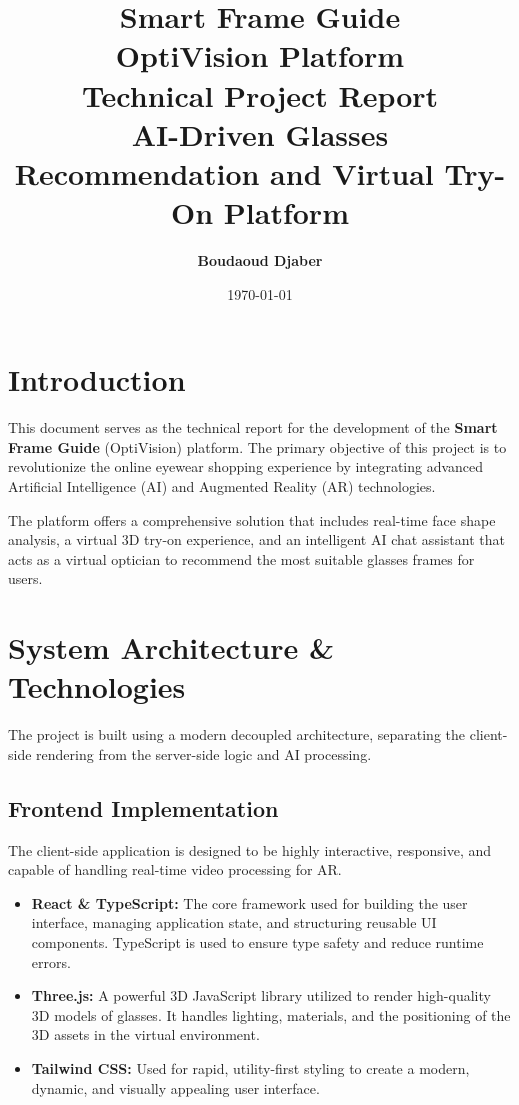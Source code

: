 \documentclass[12pt,a4paper]{article}
\title{
    \vspace{2cm}
    \textbf{\Huge \textcolor{primary}{Smart Frame Guide}}\\
    \vspace{0.5cm}
    \textbf{\Large OptiVision Platform}\\
    \vspace{1.5cm}
    \Large Technical Project Report \\
    \vspace{0.5cm}
    \large AI-Driven Glasses Recommendation and Virtual Try-On Platform
    \vspace{2cm}
}
\author{\textbf{Boudaoud Djaber}}
\date{\today}
\begin{document}
\maketitle

\tableofcontents
\vspace{1cm}

\section{Introduction}
This document serves as the technical report for the development of the \textbf{Smart Frame Guide} (OptiVision) platform. The primary objective of this project is to revolutionize the online eyewear shopping experience by integrating advanced Artificial Intelligence (AI) and Augmented Reality (AR) technologies. 

The platform offers a comprehensive solution that includes real-time face shape analysis, a virtual 3D try-on experience, and an intelligent AI chat assistant that acts as a virtual optician to recommend the most suitable glasses frames for users.

\section{System Architecture \& Technologies}
The project is built using a modern decoupled architecture, separating the client-side rendering from the server-side logic and AI processing.

\subsection{Frontend Implementation}
The client-side application is designed to be highly interactive, responsive, and capable of handling real-time video processing for AR.
\begin{itemize}[label=\textcolor{primary}{$\bullet$}]
    \item \textbf{React \& TypeScript:} The core framework used for building the user interface, managing application state, and structuring reusable UI components. TypeScript is used to ensure type safety and reduce runtime errors.
    \item \textbf{Three.js:} A powerful 3D JavaScript library utilized to render high-quality 3D models of glasses. It handles lighting, materials, and the positioning of the 3D assets in the virtual environment.
    \item \textbf{Tailwind CSS:} Used for rapid, utility-first styling to create a modern, dynamic, and visually appealing user interface.
\end{itemize}
\end{document}
